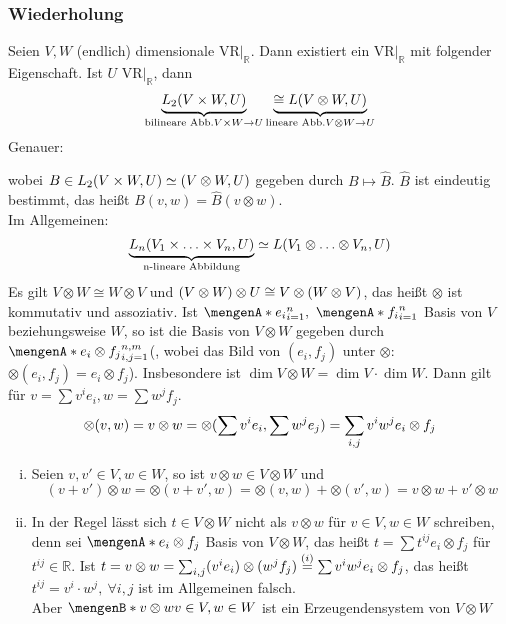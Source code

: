 \subsubsection[Wiederholung:Tensorprodukt von Vektorräumen]{Wiederholung}
\label{ssub:170}
Seien $V,W$ (endlich) dimensionale VR$\vert_{\mathds{R}}$. Dann existiert ein VR$\vert_{\mathds{R}}$ mit folgender Eigenschaft. Ist $U$ VR$\vert_{\mathds{R}}$, dann
\[
\underbrace{L_2(V\times W, U)}_{\text{bilineare Abb.} V\times W\to U} \underbrace{\cong L(V\otimes W, U)}_{\text{lineare Abb.}V\otimes W \to U}
\]
Genauer:
\begin{figure}[H]
\end{figure}
wobei $B\in L_2(V\times W, U) \simeq (V\otimes W, U)$ gegeben durch $B\mapsto \hat{B}$. $\hat{B}$ ist eindeutig bestimmt, das heißt $B(v,w) = \hat{B}(v\otimes w)$.\\
Im Allgemeinen:
\[
\underbrace{L_n(V_1\times \ldots \times V_n, U)}_{\text{n-lineare Abbildung}} \simeq L(V_1\otimes \ldots \otimes V_n, U)
\]
Es gilt $V\otimes W\cong W\otimes V$ und $(V\otimes W) \otimes U \cong V\otimes (W\otimes V)$, das heißt $\otimes$ ist kommutativ und assoziativ. 
 Ist $\set{e_i}_{i = 1}^n,\ \set{f_i}_{i = 1}^n$ Basis von $V$ beziehungsweise $W$, so ist die Basis von $V\otimes W$ gegeben durch $\set{e_i\otimes f_j}_{i,j = 1}^{n,m}$(, wobei das Bild von $(e_i,f_j)$ unter $\otimes$: $\otimes(e_i,f_j) = e_i \otimes f_j$). Insbesondere ist $\dim V\otimes W = \dim V \cdot \dim W$. Dann gilt für $v = \sum v^i e_i,w = \sum w^j f_j$.
\[
\otimes(v,w) = v\otimes w = \otimes(\sum v^i e_i, \sum w^j e_j) = \sum_{i,j} v^i w^j e_i\otimes f_j
\]
\begin{enumerate}[(i)]
\item Seien $v,v'\in V, w\in W$, so ist $v\otimes w\in V\otimes W$ und 
\[
(v+v')\otimes w = \otimes (v+v',w) = \otimes (v,w) + \otimes (v',w) = v\otimes w + v'\otimes w
\]
\item In der Regel lässt sich $t\in V\otimes W$ nicht als $v\otimes w$ für $v\in V,w\in W$ schreiben, denn sei $\set{e_i\otimes f_j}$ Basis von $V\otimes W$, das heißt $t = \sum t^{ij} e_i\otimes f_j$ für $t^{ij}\in \mathds{R}$. Ist $t = v\otimes w = \sum_{i,j} (v^i e_i)\otimes (w^j f_j) \overset{(i)}{=} \sum v^i w^j e_i\otimes f_j$, das heißt $t^{ij} = v^i\cdot w^j,\ \forall i,j$ ist im Allgemeinen falsch.\\
Aber $\set[v\otimes w]{v\in V, w\in W}$ ist ein Erzeugendensystem von $V\otimes W$
\end{enumerate}

